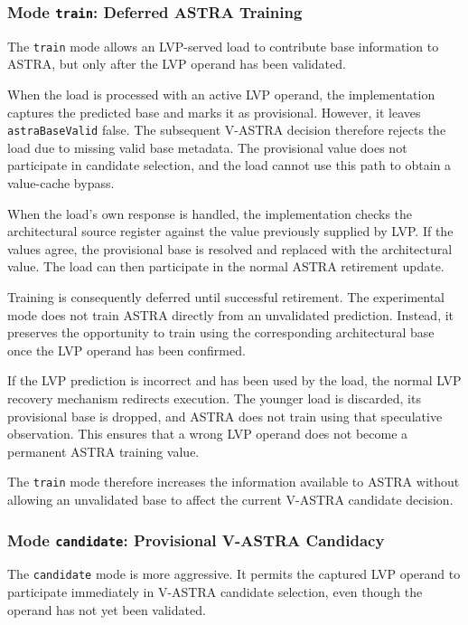 \subsubsection{Mode \texttt{train}: Deferred ASTRA Training}

The \texttt{train} mode allows an LVP-served load to contribute
base information to ASTRA, but only after the LVP operand has
been validated.

When the load is processed with an active LVP operand, the
implementation captures the predicted base and marks it as
provisional. However, it leaves \texttt{astraBaseValid} false.
The subsequent V-ASTRA decision therefore rejects the load due
to missing valid base metadata. The provisional value does not
participate in candidate selection, and the load cannot use this
path to obtain a value-cache bypass.

When the load's own response is handled, the implementation
checks the architectural source register against the value
previously supplied by LVP. If the values agree, the provisional
base is resolved and replaced with the architectural value.
The load can then participate in the normal ASTRA retirement
update.

Training is consequently deferred until successful retirement.
The experimental mode does not train ASTRA directly from an
unvalidated prediction. Instead, it preserves the opportunity to
train using the corresponding architectural base once the LVP
operand has been confirmed.

If the LVP prediction is incorrect and has been used by the load,
the normal LVP recovery mechanism redirects execution. The
younger load is discarded, its provisional base is dropped, and
ASTRA does not train using that speculative observation. This
ensures that a wrong LVP operand does not become a permanent
ASTRA training value.

The \texttt{train} mode therefore increases the information
available to ASTRA without allowing an unvalidated base to
affect the current V-ASTRA candidate decision.

\subsubsection{Mode \texttt{candidate}: Provisional V-ASTRA Candidacy}

The \texttt{candidate} mode is more aggressive. It permits the
captured LVP operand to participate immediately in V-ASTRA
candidate selection, even though the operand has not yet been
validated.

